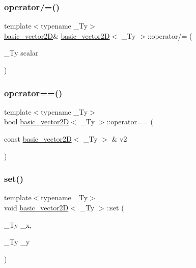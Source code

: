 \mbox{\label{structbasic__vector2_d_ac608e28b6dc06bfeb28236e44bf850d0}} 
\subsubsection{\texorpdfstring{operator/=()}{operator/=()}}
{\footnotesize\ttfamily template$<$typename \+\_\+\+Ty$>$ \\
\hyperlink{structbasic__vector2_d}{basic\+\_\+vector2D}\& \hyperlink{structbasic__vector2_d}{basic\+\_\+vector2D}$<$ \+\_\+\+Ty $>$\+::operator/= (\begin{DoxyParamCaption}\item[{\+\_\+\+Ty}]{scalar }\end{DoxyParamCaption})\hspace{0.3cm}{\ttfamily [inline]}}

\mbox{\label{structbasic__vector2_d_a51f3108036d2f3df7a4d5da488717d71}} 
\subsubsection{\texorpdfstring{operator==()}{operator==()}}
{\footnotesize\ttfamily template$<$typename \+\_\+\+Ty$>$ \\
bool \hyperlink{structbasic__vector2_d}{basic\+\_\+vector2D}$<$ \+\_\+\+Ty $>$\+::operator== (\begin{DoxyParamCaption}\item[{const \hyperlink{structbasic__vector2_d}{basic\+\_\+vector2D}$<$ \+\_\+\+Ty $>$ \&}]{v2 }\end{DoxyParamCaption})\hspace{0.3cm}{\ttfamily [inline]}}

\mbox{\label{structbasic__vector2_d_a4085ab29a73798d9a1958eef96bf5f33}} 
\subsubsection{\texorpdfstring{set()}{set()}}
{\footnotesize\ttfamily template$<$typename \+\_\+\+Ty$>$ \\
void \hyperlink{structbasic__vector2_d}{basic\+\_\+vector2D}$<$ \+\_\+\+Ty $>$\+::set (\begin{DoxyParamCaption}\item[{\+\_\+\+Ty}]{\+\_\+x,  }\item[{\+\_\+\+Ty}]{\+\_\+y }\end{DoxyParamCaption})\hspace{0.3cm}{\ttfamily [inline]}}

